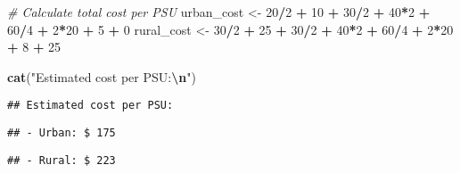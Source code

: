 \documentclass[
]{article}
\newenvironment{Shaded}{\begin{snugshade}}{\end{snugshade}}
\newcommand{\CommentTok}[1]{\textcolor[rgb]{0.56,0.35,0.01}{\textit{#1}}}
\newcommand{\DecValTok}[1]{\textcolor[rgb]{0.00,0.00,0.81}{#1}}
\newcommand{\FunctionTok}[1]{\textcolor[rgb]{0.13,0.29,0.53}{\textbf{#1}}}
\newcommand{\NormalTok}[1]{#1}
\newcommand{\OtherTok}[1]{\textcolor[rgb]{0.56,0.35,0.01}{#1}}
\newcommand{\SpecialCharTok}[1]{\textcolor[rgb]{0.81,0.36,0.00}{\textbf{#1}}}
\newcommand{\StringTok}[1]{\textcolor[rgb]{0.31,0.60,0.02}{#1}}
\begin{document}
\begin{Shaded}
\begin{Highlighting}[]
\CommentTok{\# Calculate total cost per PSU}
\NormalTok{urban\_cost }\OtherTok{\textless{}{-}} \DecValTok{20}\SpecialCharTok{/}\DecValTok{2} \SpecialCharTok{+} \DecValTok{10} \SpecialCharTok{+} \DecValTok{30}\SpecialCharTok{/}\DecValTok{2} \SpecialCharTok{+} \DecValTok{40}\SpecialCharTok{*}\DecValTok{2} \SpecialCharTok{+} \DecValTok{60}\SpecialCharTok{/}\DecValTok{4} \SpecialCharTok{+} \DecValTok{2}\SpecialCharTok{*}\DecValTok{20} \SpecialCharTok{+} \DecValTok{5} \SpecialCharTok{+} \DecValTok{0}
\NormalTok{rural\_cost }\OtherTok{\textless{}{-}} \DecValTok{30}\SpecialCharTok{/}\DecValTok{2} \SpecialCharTok{+} \DecValTok{25} \SpecialCharTok{+} \DecValTok{30}\SpecialCharTok{/}\DecValTok{2} \SpecialCharTok{+} \DecValTok{40}\SpecialCharTok{*}\DecValTok{2} \SpecialCharTok{+} \DecValTok{60}\SpecialCharTok{/}\DecValTok{4} \SpecialCharTok{+} \DecValTok{2}\SpecialCharTok{*}\DecValTok{20} \SpecialCharTok{+} \DecValTok{8} \SpecialCharTok{+} \DecValTok{25}

\FunctionTok{cat}\NormalTok{(}\StringTok{"Estimated cost per PSU:}\SpecialCharTok{\textbackslash{}n}\StringTok{"}\NormalTok{)}
\end{Highlighting}
\end{Shaded}

\begin{verbatim}
## Estimated cost per PSU:
\end{verbatim}

\begin{Shaded}
\end{Shaded}

\begin{verbatim}
## - Urban: $ 175
\end{verbatim}

\begin{Shaded}
\end{Shaded}

\begin{verbatim}
## - Rural: $ 223
\end{verbatim}
\end{document}
